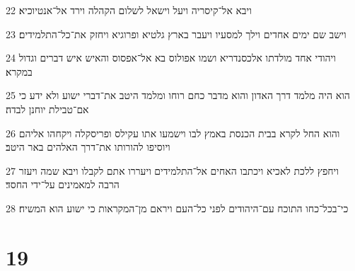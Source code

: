 \par 22 ויבא אל־קיסריה ויעל וישאל לשלום הקהלה וירד אל־אנטיוכיא׃
\par 23 וישב שם ימים אחדים וילך למסעיו ויעבר בארץ גלטיא ופרוגיא ויחזק את־כל־התלמידים׃
\par 24 ויהודי אחד מולדתו אלכסנדריא ושמו אפולוס בא אל־אפסוס והאיש איש דברים וגדול במקרא׃
\par 25 הוא היה מלמד דרך האדון והוא מדבר כחם רוחו ומלמד היטב את־דברי ישוע ולא ידע כי אם־טבילת יוחנן לבדה׃
\par 26 והוא החל לקרא בבית הכנסת באמץ לבו וישמעו אתו עקילס ופריסקלה ויקחהו אליהם ויוסיפו להורותו את־דרך האלהים באר היטב׃
\par 27 ויחפץ ללכת לאכיא ויכתבו האחים אל־התלמידים ויעררו אתם לקבלו ויבא שמה ויעזר הרבה למאמינים על־ידי החסד׃
\par 28 כי־בכל־כחו התוכח עם־היהודים לפני כל־העם ויראם מן־המקראות כי ישוע הוא המשיח׃

\chapter{19}

